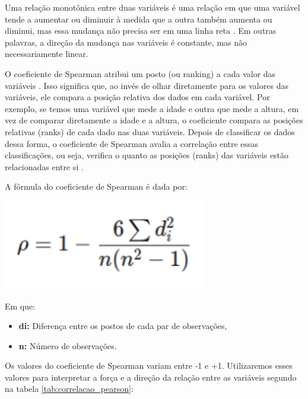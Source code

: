 \begin{apendicesenv}
Uma relação monotônica entre duas variáveis é uma relação em que uma variável tende a aumentar ou diminuir à medida que a outra também aumenta ou diminui, mas essa mudança não precisa ser em uma linha reta \cite{restrepo2007}. Em outras palavras, a direção da mudança nas variáveis é constante, mas não necessariamente linear.

O coeficiente de Spearman atribui um posto (ou ranking) a cada valor das variáveis \cite{sousa2019}. Isso significa que, ao invés de olhar diretamente para os valores das variáveis, ele compara a posição relativa dos dados em cada variável. Por exemplo, se temos uma variável que mede a idade e outra que mede a altura, em vez de comparar diretamente a idade e a altura, o coeficiente compara as posições relativas (ranks) de cada dado nas duas variáveis. Depois de classificar os dados dessa forma, o coeficiente de Spearman avalia a correlação entre essas classificações, ou seja, verifica o quanto as posições (ranks) das variáveis estão relacionadas entre si \cite{sousa2019}.

A fórmula do coeficiente de Spearman é dada por:

\begin{center}
  \includegraphics[scale=0.8]{figuras/CoeficientedeSpearman.pdf}
\end{center}


Em que:
\begin{itemize}
  \item \textbf{di:} Diferença entre os postos de cada par de observações,
  \item \textbf{n:} Número de observações.
\end{itemize}

Os valores do coeficiente de Spearman variam entre -1 e +1. Utilizaremos esses valores para interpretar a força e a direção da relação entre as variáveis segundo  na tabela \ref{tab:correlacao_pearson}:


\end{apendicesenv}
